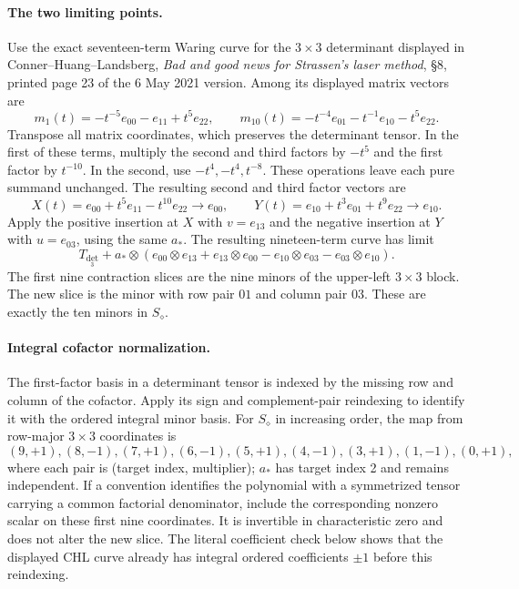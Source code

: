 \paragraph{The two limiting points.}
Use the exact seventeen-term Waring curve for the $3\times3$ determinant
displayed in Conner--Huang--Landsberg, \emph{Bad and good news for
Strassen's laser method}, \S8, printed page 23 of the 6 May 2021 version.
Among its displayed matrix vectors are
\[
 m_1(t)=-t^{-5}e_{00}-e_{11}+t^5e_{22},\qquad
 m_{10}(t)=-t^{-4}e_{01}-t^{-1}e_{10}-t^5e_{22}.
\]
Transpose all matrix coordinates, which preserves the determinant tensor.
In the first of these terms, multiply the second and third factors by
$-t^5$ and the first factor by $t^{-10}$.  In the second, use
$-t^4,-t^4,t^{-8}$.  These operations leave each pure summand unchanged.
The resulting second and third factor vectors are
\[
 X(t)=e_{00}+t^5e_{11}-t^{10}e_{22}\longrightarrow e_{00},
 \qquad
 Y(t)=e_{10}+t^3e_{01}+t^9e_{22}\longrightarrow e_{10}.
\]
Apply the positive insertion at $X$ with $v=e_{13}$ and the negative
insertion at $Y$ with $u=e_{03}$, using the same $a_\ast$.
The resulting nineteen-term curve has limit
\[
 T_{\det_3}+a_\ast\otimes
 (e_{00}\otimes e_{13}+e_{13}\otimes e_{00}
       -e_{10}\otimes e_{03}-e_{03}\otimes e_{10}).
\]
The first nine contraction slices are the nine minors of the upper-left
$3\times3$ block.  The new slice is the minor with row pair $01$ and
column pair $03$.  These are exactly the ten minors in $S_\diamond$.

\paragraph{Integral cofactor normalization.}
The first-factor basis in a determinant tensor is indexed by the missing
row and column of the cofactor.  Apply its sign and complement-pair
reindexing to identify it with the ordered integral minor basis.
For $S_\diamond$ in increasing order, the map from row-major
$3\times3$ coordinates is
\[
 (9,+1),(8,-1),(7,+1),(6,-1),(5,+1),(4,-1),
 (3,+1),(1,-1),(0,+1),
\]
where each pair is (target index, multiplier); $a_\ast$ has target index
2 and remains independent.  If a convention identifies the polynomial
with a symmetrized tensor carrying a common factorial denominator, include
the corresponding nonzero scalar on these first nine coordinates.
It is invertible in characteristic zero and does not alter the new slice.
The literal coefficient check below shows that the displayed CHL curve
already has integral ordered coefficients $\pm1$ before this reindexing.

